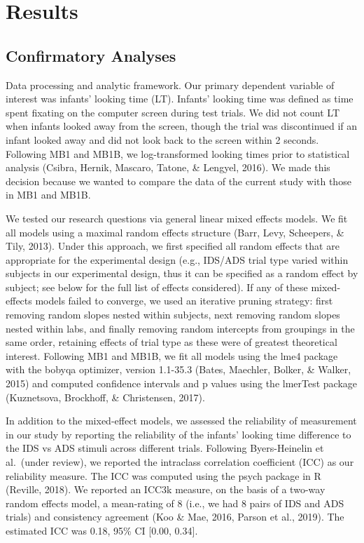 \documentclass[
  ,man,floatsintext]{apa6}
\begin{document}
\hypertarget{results}{%
\section{Results}\label{results}}

\hypertarget{confirmatory-analyses}{%
\subsection{Confirmatory Analyses}\label{confirmatory-analyses}}

Data processing and analytic framework. Our primary dependent variable of interest was infants' looking time (LT). Infants' looking time was defined as time spent fixating on the computer screen during test trials. We did not count LT when infants looked away from the screen, though the trial was discontinued if an infant looked away and did not look back to the screen within 2 seconds. Following MB1 and MB1B, we log-transformed looking times prior to statistical analysis (Csibra, Hernik, Mascaro, Tatone, \& Lengyel, 2016). We made this decision because we wanted to compare the data of the current study with those in MB1 and MB1B.

We tested our research questions via general linear mixed effects models. We fit all models using a maximal random effects structure (Barr, Levy, Scheepers, \& Tily, 2013). Under this approach, we first specified all random effects that are appropriate for the experimental design (e.g., IDS/ADS trial type varied within subjects in our experimental design, thus it can be specified as a random effect by subject; see below for the full list of effects considered). If any of these mixed-effects models failed to converge, we used an iterative pruning strategy: first removing random slopes nested within subjects, next removing random slopes nested within labs, and finally removing random intercepts from groupings in the same order, retaining effects of trial type as these were of greatest theoretical interest. Following MB1 and MB1B, we fit all models using the lme4 package with the bobyqa optimizer, version 1.1-35.3 (Bates, Maechler, Bolker, \& Walker, 2015) and computed confidence intervals and p values using the lmerTest package (Kuznetsova, Brockhoff, \& Christensen, 2017).

In addition to the mixed-effect models, we assessed the reliability of measurement in our study by reporting the reliability of the infants' looking time difference to the IDS vs ADS stimuli across different trials. Following Byers-Heinelin et al.~(under review), we reported the intraclass correlation coefficient (ICC) as our reliability measure. The ICC was computed using the psych package in R (Reville, 2018). We reported an ICC3k measure, on the basis of a two-way random effects model, a mean-rating of 8 (i.e., we had 8 pairs of IDS and ADS trials) and consistency agreement (Koo \& Mae, 2016, Parson et al., 2019). The estimated ICC was 0.18, 95\% CI {[}0.00, 0.34{]}.
\end{document}
